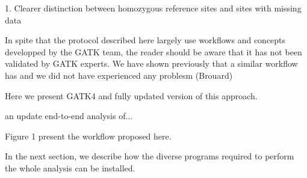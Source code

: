 \documentclass[]{article}
\begin{document}
1. Clearer distinction between homozygous reference sites and sites with missing data



In spite that the protocol described here largely use workflows and concepts developped by the GATK team, the reader should be aware that it has not been validated by GATK experts. We have shown previously that a similar workflow has and we did not have experienced any problesm (Brouard)

Here we present GATK4 and fully updated version of this approach.

an update end-to-end analysis of...



Figure 1 present the workflow proposed here.









In the next section, we describe how the diverse programs required to perform the whole analysis can be installed.







\end{document}

